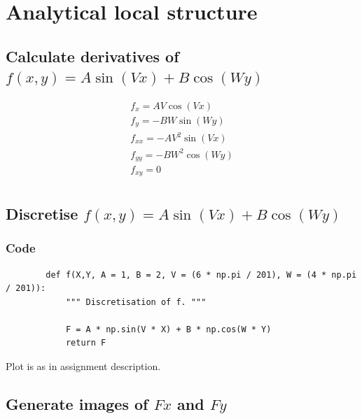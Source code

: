 \documentclass[abstract=true]{scrartcl}
\title{}
\author{Joris Stork, Lucas Swartsenburg}
\begin{document}
\maketitle


\section{Analytical local structure}

    \subsection{Calculate derivatives of $f(x,y)=A \sin(V x)+B \cos(W y)$}

        \begin{eqnarray}
            f_{x} = A V \cos(V x) \nonumber \\ 
            f_{y} = -B W \sin(W y) \nonumber \\
            f_{xx} = -A V^2 \sin(V x) \nonumber \\
            f_{yy} = -B W^2 \cos(W y) \nonumber \\
            f_{xy} = 0 \nonumber \\
        \end{eqnarray}

    \subsection{Discretise $f(x,y)=A \sin(V x)+B \cos(W y)$}

        \subsubsection{Code}
        \begin{verbatim}
        def f(X,Y, A = 1, B = 2, V = (6 * np.pi / 201), W = (4 * np.pi / 201)):
            """ Discretisation of f. """
            
            F = A * np.sin(V * X) + B * np.cos(W * Y)
            return F
        \end{verbatim}

        Plot is as in assignment description.

    \subsection{Generate images of $Fx$ and $Fy$}
\end{document}
